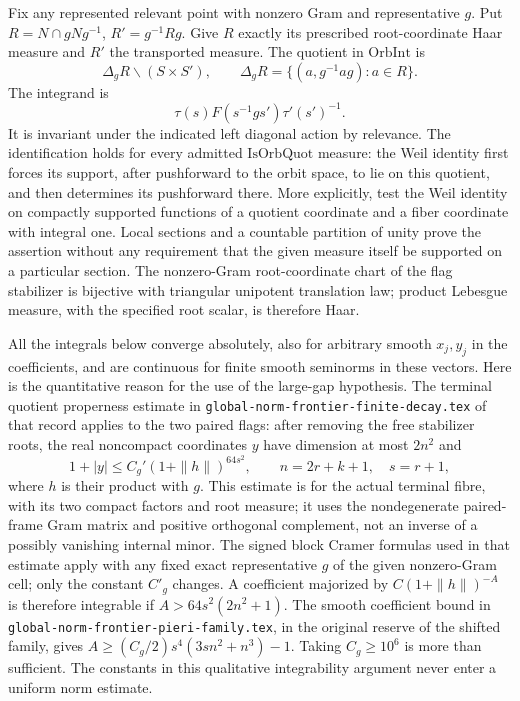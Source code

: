 Fix any represented relevant point with nonzero Gram
and representative \(g\). Put \(R=N\cap gN g^{-1}\),
\(R'=g^{-1}Rg\). Give \(R\) exactly its prescribed
root-coordinate Haar measure and \(R'\) the transported
measure. The quotient in \(\mathrm{OrbInt}\) is
\[
 \Delta_g R\backslash(S\times S'),\qquad
       \Delta_g R=\{(a,g^{-1}ag):a\in R\}.
\]
The integrand is
\[
 \tau(s)F(s^{-1}gs')\tau'(s')^{-1}.
\]
It is invariant under the indicated left diagonal action
by relevance. The identification holds for every admitted
\(\mathrm{IsOrbQuot}\) measure: the Weil identity first
forces its support, after pushforward to the orbit
space, to lie on this quotient, and then determines its
pushforward there. More explicitly, test the Weil identity
on compactly supported functions of a quotient coordinate
and a fiber coordinate with integral one. Local sections
and a countable partition of unity prove the assertion
without any requirement that the given measure itself
be supported on a particular section.
The nonzero-Gram root-coordinate chart of the flag
stabilizer is bijective with triangular unipotent
translation law; product Lebesgue measure, with the
specified root scalar, is therefore Haar.

All the integrals below converge absolutely, also for
arbitrary smooth \(x_j,y_j\) in the coefficients, and are
continuous for finite smooth seminorms in these vectors.
Here is the quantitative reason for the use of the
large-gap hypothesis. The terminal quotient properness
estimate in \texttt{global-norm-frontier-finite-decay.tex}
of that record applies
to the two paired flags: after removing the free
stabilizer roots, the real noncompact coordinates \(y\)
have dimension at most \(2n^2\) and
\[
                 1+|y|\le C_g'(1+\|h\|)^{64s^2},
       \qquad n=2r+k+1,\quad s=r+1 ,
\]
where \(h\) is their product with \(g\). This estimate is
for the actual terminal fibre, with its two compact
factors and root measure; it uses the nondegenerate
paired-frame Gram matrix and positive orthogonal
complement, not an inverse of a possibly vanishing
internal minor. The signed block Cramer formulas
used in that estimate apply with any fixed exact
representative \(g\) of the given nonzero-Gram cell;
only the constant \(C'_g\) changes. A coefficient
majorized by \(C(1+\|h\|)^{-A}\) is therefore integrable
if \(A>64s^2(2n^2+1)\). The smooth coefficient bound
in \texttt{global-norm-frontier-pieri-family.tex},
in the original reserve of the shifted family, gives
\(A\ge (C_g/2)s^4(3sn^2+n^3)-1\). Taking
\(C_g\ge10^6\) is more than sufficient. The constants
in this qualitative integrability argument never enter
a uniform norm estimate.

